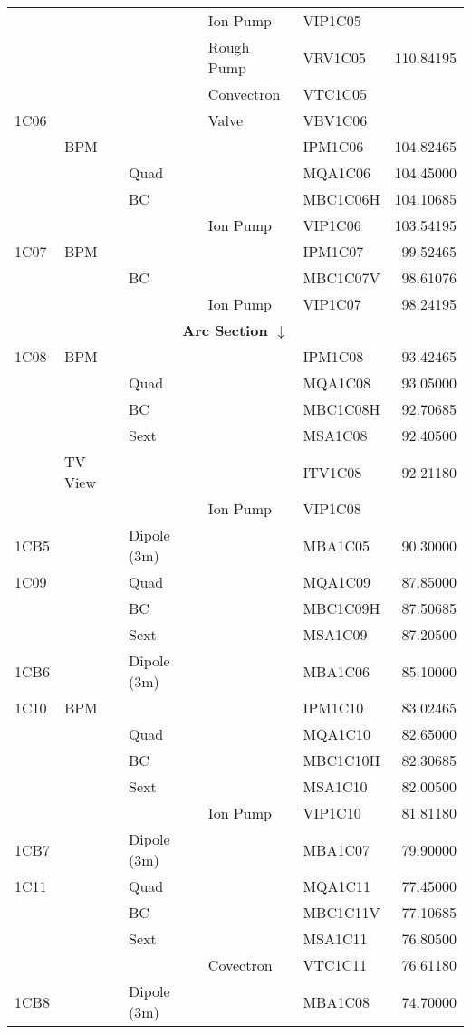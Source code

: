 \begin{longtable}[hpt]{lllllr}
&&& Ion Pump & VIP1C05 & \\
&&& Rough Pump & VRV1C05 & 110.84195 \\
&&& Convectron & VTC1C05 & \\
1C06 &&& Valve & VBV1C06 & \\
& BPM &&& IPM1C06 & 104.82465 \\
&& Quad && MQA1C06 & 104.45000 \\
&& BC && MBC1C06H & 104.10685 \\
&&& Ion Pump & VIP1C06 & 103.54195 \\
1C07 & BPM &    &          & IPM1C07  & 99.52465 \\
     &     & BC &          & MBC1C07V & 98.61076 \\
     &     &    & Ion Pump & VIP1C07  & 98.24195 \\
\hline \multicolumn{6}{c}{{\bf Arc Section $\downarrow$}} \\ \hline 
1C08 & BPM &&& IPM1C08 & 93.42465 \\
&& Quad && MQA1C08 & 93.05000 \\
&& BC && MBC1C08H & 92.70685 \\
&& Sext && MSA1C08 & 92.40500 \\
& TV View &&& ITV1C08 & 92.21180 \\
&&& Ion Pump & VIP1C08 & \\
1CB5 && Dipole (3m) && MBA1C05 & 90.30000 \\
1C09 && Quad && MQA1C09 & 87.85000 \\
&& BC && MBC1C09H & 87.50685 \\
&& Sext && MSA1C09 & 87.20500 \\
1CB6 && Dipole (3m) && MBA1C06 & 85.10000 \\
1C10 & BPM &&& IPM1C10 & 83.02465 \\
&& Quad && MQA1C10 & 82.65000 \\
&& BC && MBC1C10H & 82.30685 \\
&& Sext && MSA1C10 & 82.00500 \\
&&& Ion Pump & VIP1C10 & 81.81180 \\
1CB7 && Dipole (3m) && MBA1C07 & 79.90000 \\
1C11 && Quad && MQA1C11 & 77.45000 \\
&& BC && MBC1C11V & 77.10685 \\
&& Sext && MSA1C11 & 76.80500 \\
&&& Covectron & VTC1C11 & 76.61180 \\
1CB8 && Dipole (3m) && MBA1C08 & 74.70000 \\

\end{longtable}
